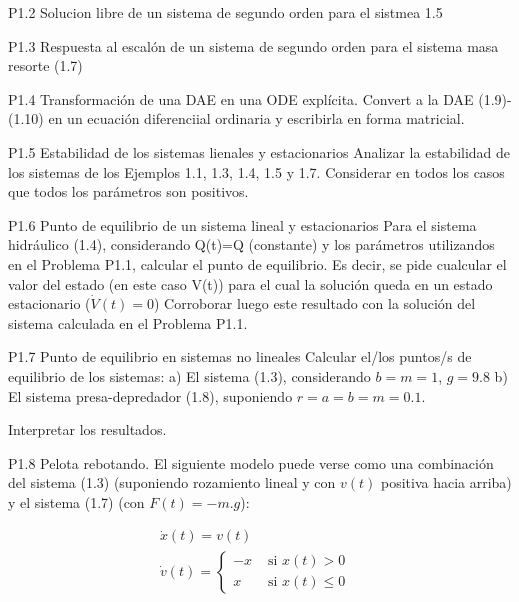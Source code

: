 \documentclass{article}
\begin{document}
P1.2 Solucion libre de un sistema de segundo orden
para el sistmea 1.5

P1.3 Respuesta al escalón de un sistema de segundo orden
para el sistema masa resorte (1.7)

P1.4 Transformación de una DAE en una ODE explícita. Convert a la DAE (1.9)-(1.10) en un ecuación diferenciial ordinaria y escribirla en forma matricial.

P1.5 Estabilidad de los sistemas lienales y estacionarios
Analizar la estabilidad de los sistemas de los Ejemplos 1.1, 1.3, 1.4, 1.5 y 1.7. Considerar en todos los casos que todos los parámetros son positivos.

P1.6 Punto de equilibrio de un sistema lineal y estacionarios Para el sistema hidráulico (1.4), considerando Q(t)=Q (constante) y los parámetros utilizandos en el Problema P1.1, calcular el punto de equilibrio. Es decir, se pide cualcular el valor del estado (en este caso V(t)) para el cual la solución queda en un estado estacionario ($\dot{V}(t)=0$)
Corroborar luego este resultado con la solución del sistema calculada en el Problema P1.1.

P1.7 Punto de equilibrio en sistemas no lineales Calcular el/los puntos/s de equilibrio de los sistemas:
a) El sistema (1.3), considerando $b=m=1$, $g=9.8$
b) El sistema presa-depredador (1.8), suponiendo $r=a=b=m=0.1$. 

Interpretar los resultados.

P1.8 Pelota rebotando. El siguiente modelo puede verse como una combinación del sistema (1.3) (suponiendo rozamiento lineal y con $v(t)$ positiva hacia arriba) y el sistema (1.7) (con $F(t)=-m.g$):

\begin{eqnarray}
\dot{x}(t) = v(t)	\nonumber \\
\dot{v}(t) = \left\{ \begin{array}{rl}
 -x &\mbox{ si $x(t) > 0$} \\
  x &\mbox{ si $x(t) \leq 0$ }
       \end{array} \right.	\nonumber \\
\end{eqnarray}
\end{document}
